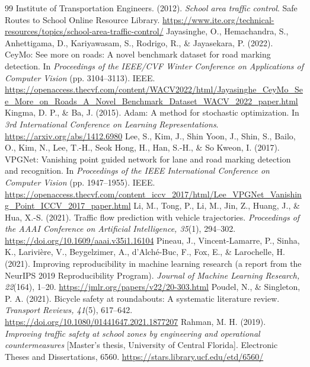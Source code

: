 \documentclass[11pt]{article}
\begin{document}
\begin{thebibliography}{99}
 Institute of Transportation Engineers. (2012). \emph{School area traffic control}. Safe Routes to School Online Resource Library. \url{https://www.ite.org/technical-resources/topics/school-area-traffic-control/}
 Jayasinghe, O., Hemachandra, S., Anhettigama, D., Kariyawasam, S., Rodrigo, R., \& Jayasekara, P. (2022). CeyMo: See more on roads: A novel benchmark dataset for road marking detection. In \emph{Proceedings of the IEEE/CVF Winter Conference on Applications of Computer Vision} (pp. 3104--3113). IEEE. \url{https://openaccess.thecvf.com/content/WACV2022/html/Jayasinghe_CeyMo_See_More_on_Roads_A_Novel_Benchmark_Dataset_WACV_2022_paper.html}
 Kingma, D. P., \& Ba, J. (2015). Adam: A method for stochastic optimization. In \emph{3rd International Conference on Learning Representations}. \url{https://arxiv.org/abs/1412.6980}
 Lee, S., Kim, J., Shin Yoon, J., Shin, S., Bailo, O., Kim, N., Lee, T.-H., Seok Hong, H., Han, S.-H., \& So Kweon, I. (2017). VPGNet: Vanishing point guided network for lane and road marking detection and recognition. In \emph{Proceedings of the IEEE International Conference on Computer Vision} (pp. 1947--1955). IEEE. \url{https://openaccess.thecvf.com/content_iccv_2017/html/Lee_VPGNet_Vanishing_Point_ICCV_2017_paper.html}
 Li, M., Tong, P., Li, M., Jin, Z., Huang, J., \& Hua, X.-S. (2021). Traffic flow prediction with vehicle trajectories. \emph{Proceedings of the AAAI Conference on Artificial Intelligence, 35}(1), 294--302. \url{https://doi.org/10.1609/aaai.v35i1.16104}
 Pineau, J., Vincent-Lamarre, P., Sinha, K., Larivi{\`e}re, V., Beygelzimer, A., d'Alch{\'e}-Buc, F., Fox, E., \& Larochelle, H. (2021). Improving reproducibility in machine learning research (a report from the NeurIPS 2019 Reproducibility Program). \emph{Journal of Machine Learning Research, 22}(164), 1--20. \url{https://jmlr.org/papers/v22/20-303.html}
 Poudel, N., \& Singleton, P. A. (2021). Bicycle safety at roundabouts: A systematic literature review. \emph{Transport Reviews, 41}(5), 617--642. \url{https://doi.org/10.1080/01441647.2021.1877207}
 Rahman, M. H. (2019). \emph{Improving traffic safety at school zones by engineering and operational countermeasures} [Master's thesis, University of Central Florida]. Electronic Theses and Dissertations, 6560. \url{https://stars.library.ucf.edu/etd/6560/}

\end{thebibliography}
\end{document}
